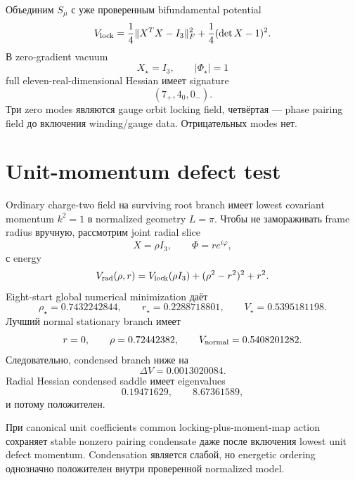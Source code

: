 Объединим \(S_\mu\) с уже проверенным bifundamental potential
\begin{equation}
 V_{\rm lock}
 =\frac14\|X^TX-I_3\|_F^2
 +\frac14(\det X-1)^2.
\end{equation}
В zero-gradient vacuum
\begin{equation}
 X_\star=I_3,
 \qquad
 |\Phi_\star|=1
\end{equation}
full eleven-real-dimensional Hessian имеет signature
\begin{equation}
 (7_+,4_0,0_-).
\end{equation}
Три zero modes являются gauge orbit locking field, четвёртая --- phase
pairing field до включения winding/gauge data. Отрицательных modes нет.

\section{Unit-momentum defect test}

Ordinary charge-two field на surviving root branch имеет lowest covariant
momentum \(k^2=1\) в normalized geometry \(L=\pi\). Чтобы не замораживать
frame radius вручную, рассмотрим joint radial slice
\begin{equation}
 X=\rho I_3,
 \qquad
 \Phi=r e^{i\varphi},
\end{equation}
с energy
\begin{equation}
 V_{\rm rad}(\rho,r)
 =V_{\rm lock}(\rho I_3)
 +(\rho^2-r^2)^2+r^2.
 \label{eq:joint-moment-map-defect-radial}
\end{equation}
Eight-start global numerical minimization даёт
\begin{equation}
 \rho_\star=0.7432242844,
 \qquad
 r_\star=0.2288718801,
 \qquad
 V_\star=0.5395181198.
\end{equation}
Лучший normal stationary branch имеет
\begin{equation}
 r=0,
 \qquad
 \rho=0.72442382,
 \qquad
 V_{\rm normal}=0.5408201282.
\end{equation}
Следовательно, condensed branch ниже на
\begin{equation}
 \Delta V=0.0013020084.
\end{equation}
Radial Hessian condensed saddle имеет eigenvalues
\begin{equation}
 0.19471629,
 \qquad
 8.67361589,
\end{equation}
и потому положителен.

\begin{proposition}
При canonical unit coefficients common locking-plus-moment-map action
сохраняет stable nonzero pairing condensate даже после включения lowest
unit defect momentum. Condensation является слабой, но energetic ordering
однозначно положителен внутри проверенной normalized model.
\end{proposition}


